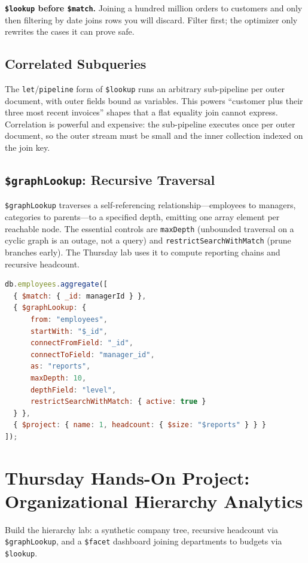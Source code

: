\begin{pitfall}
\textbf{\texttt{\$lookup} before \texttt{\$match}.} Joining a hundred million orders to customers and only then filtering by date joins rows you will discard. Filter first; the optimizer only rewrites the cases it can prove safe.
\end{pitfall}

\subsection{Correlated Subqueries}
The \texttt{let}/\texttt{pipeline} form of \texttt{\$lookup} runs an arbitrary sub-pipeline per outer document, with outer fields bound as variables. This powers ``customer plus their three most recent invoices'' shapes that a flat equality join cannot express. Correlation is powerful and expensive: the sub-pipeline executes once per outer document, so the outer stream must be small and the inner collection indexed on the join key.

\subsection{\texttt{\$graphLookup}: Recursive Traversal}
\texttt{\$graphLookup} traverses a self-referencing relationship---employees to managers, categories to parents---to a specified depth, emitting one array element per reachable node. The essential controls are \texttt{maxDepth} (unbounded traversal on a cyclic graph is an outage, not a query) and \texttt{restrictSearchWithMatch} (prune branches early). The Thursday lab uses it to compute reporting chains and recursive headcount.

\begin{lstlisting}[language=JavaScript, caption={Recursive reporting chain with bounded depth.}]
db.employees.aggregate([
  { $match: { _id: managerId } },
  { $graphLookup: {
      from: "employees",
      startWith: "$_id",
      connectFromField: "_id",
      connectToField: "manager_id",
      as: "reports",
      maxDepth: 10,
      depthField: "level",
      restrictSearchWithMatch: { active: true }
  } },
  { $project: { name: 1, headcount: { $size: "$reports" } } }
]);
\end{lstlisting}

\section{Thursday Hands-On Project: Organizational Hierarchy Analytics}
Build the hierarchy lab: a synthetic company tree, recursive headcount via \texttt{\$graphLookup}, and a \texttt{\$facet} dashboard joining departments to budgets via \texttt{\$lookup}.

